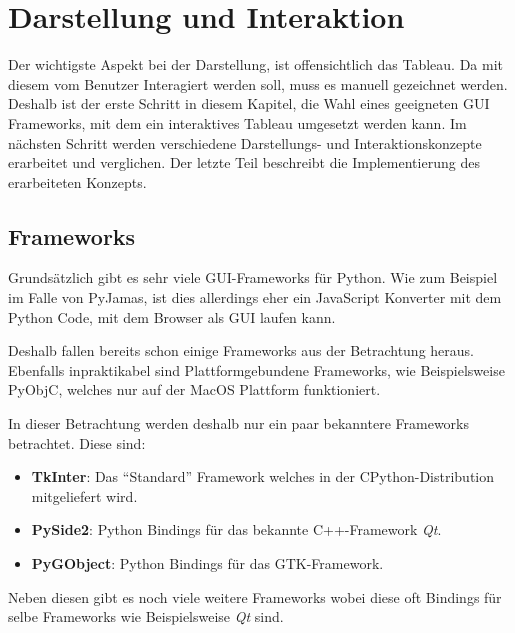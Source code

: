 
\chapter{\label{sec:darstellung_interaktion}Darstellung und Interaktion}
Der wichtigste Aspekt bei der Darstellung, ist offensichtlich das Tableau. Da mit diesem vom Benutzer Interagiert werden soll, muss es manuell gezeichnet werden. Deshalb ist der erste Schritt in diesem Kapitel, die Wahl eines geeigneten \ac{GUI} Frameworks, mit dem ein interaktives Tableau umgesetzt werden kann. Im nächsten Schritt werden verschiedene Darstellungs- und Interaktionskonzepte erarbeitet und verglichen. Der letzte Teil beschreibt die Implementierung des erarbeiteten Konzepts.

\section{Frameworks}
Grundsätzlich gibt es sehr viele \ac{GUI}-Frameworks für Python. Wie zum Beispiel im Falle von PyJamas, ist dies allerdings eher ein JavaScript Konverter mit dem Python Code, mit dem Browser als \ac{GUI} laufen kann.

Deshalb fallen bereits schon einige Frameworks aus der Betrachtung heraus. Ebenfalls inpraktikabel sind Plattformgebundene Frameworks, wie Beispielsweise PyObjC, welches nur auf der MacOS Plattform funktioniert.

In dieser Betrachtung werden deshalb nur ein paar bekanntere Frameworks betrachtet. Diese sind:
\begin{itemize}
\item \textbf{TkInter}: Das ``Standard'' Framework welches in der CPython-Distribution mitgeliefert wird.

\item \textbf{PySide2}: Python Bindings für das bekannte C++-Framework \textit{Qt}.

\item \textbf{PyGObject}: Python Bindings für das GTK-Framework.
\end{itemize}
Neben diesen gibt es noch viele weitere Frameworks wobei diese oft Bindings für selbe Frameworks wie Beispielsweise \textit{Qt} sind.

